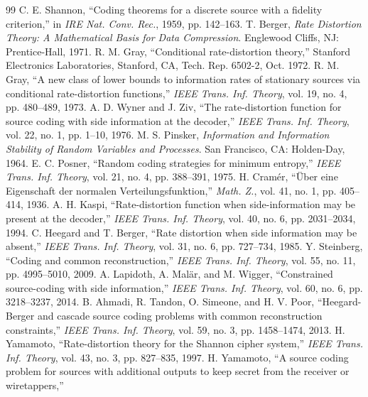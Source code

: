 \documentclass[11pt,onecolumn]{IEEEtran}
\begin{document}
\begin{thebibliography}{99}
 C. E. Shannon, ``Coding theorems for a discrete source
with a fidelity criterion,'' in \emph{IRE Nat. Conv. Rec.}, 1959, pp. 142--163.
 T. Berger, \emph{Rate Distortion Theory: A Mathematical
Basis for Data Compression}. Englewood Cliffs, NJ: Prentice-Hall, 1971.
 R. M. Gray, ``Conditional rate-distortion theory,''
Stanford Electronics Laboratories, Stanford, CA, Tech. Rep. 6502-2, Oct. 1972.
 R. M. Gray, ``A new class of lower bounds to information
rates of stationary sources via conditional rate-distortion functions,''
\emph{IEEE Trans. Inf. Theory}, vol. 19, no. 4, pp. 480--489, 1973.
 A. D. Wyner and J. Ziv, ``The rate-distortion function
for source coding with side information at the decoder,'' \emph{IEEE Trans.
Inf. Theory}, vol. 22, no. 1, pp. 1--10, 1976.
 M. S. Pinsker, \emph{Information and Information
Stability of Random Variables and Processes}. San Francisco, CA:
Holden-Day, 1964.
 E. C. Posner, ``Random coding strategies for minimum
entropy,'' \emph{IEEE Trans. Inf. Theory}, vol. 21, no. 4, pp. 388--391,
1975.
 H. Cram\'er, ``\"Uber eine Eigenschaft der normalen
Verteilungsfunktion,'' \emph{Math. Z.}, vol. 41, no. 1, pp. 405--414,
1936.
 A. H. Kaspi, ``Rate-distortion function when
side-information may be present at the decoder,'' \emph{IEEE Trans. Inf.
Theory}, vol. 40, no. 6, pp. 2031--2034, 1994.
 C. Heegard and T. Berger, ``Rate distortion when
side information may be absent,'' \emph{IEEE Trans. Inf. Theory}, vol. 31,
no. 6, pp. 727--734, 1985.
 Y. Steinberg, ``Coding and common reconstruction,''
\emph{IEEE Trans. Inf. Theory}, vol. 55, no. 11, pp. 4995--5010, 2009.
 A. Lapidoth, A. Mal\"ar, and M. Wigger, ``Constrained
source-coding with side information,'' \emph{IEEE Trans. Inf. Theory},
vol. 60, no. 6, pp. 3218--3237, 2014.
 B. Ahmadi, R. Tandon, O. Simeone, and H. V. Poor,
``Heegard-Berger and cascade source coding problems with common reconstruction
constraints,'' \emph{IEEE Trans. Inf. Theory}, vol. 59, no. 3,
pp. 1458--1474, 2013.
 H. Yamamoto, ``Rate-distortion theory for the Shannon
cipher system,'' \emph{IEEE Trans. Inf. Theory}, vol. 43, no. 3, pp. 827--835,
1997.
 H. Yamamoto, ``A source coding problem for sources
with additional outputs to keep secret from the receiver or wiretappers,''

\end{thebibliography}
\end{document}
